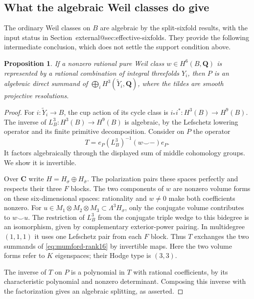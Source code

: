 \documentclass[11pt]{article}
\makeatletter
\providecommand{\compref}[1]{\csname external@#1\endcsname}
\newtheorem{proposition}[theorem]{Proposition}
\theoremstyle{definition}
\theoremstyle{remark}
\makeatother
\begin{document}
\subsection{What the algebraic Weil classes do give}

The ordinary Weil classes on $B$ are algebraic by the split-sixfold
results, with the input status in Section~\compref{sec:effective-sixfolds}.
They provide the following intermediate conclusion, which does not
settle the support condition above.

\begin{proposition}\label{prop:weil-support-middle}
If a nonzero rational pure Weil class $w\in H^6(B,\mathbf Q)$ is
represented by a rational combination of integral threefolds $Y_i$,
then $P$ is an algebraic direct summand of
$\bigoplus_i H^3(\widetilde Y_i,\mathbf Q)$, where the tildes are
smooth projective resolutions.
\end{proposition}

\begin{proof}
For $i:\widetilde Y_i\to B$, the cup action of its cycle class is
$i_*i^*:H^3(B)\to H^9(B)$.
The inverse of $L_B^3:H^3(B)\to H^9(B)$ is algebraic, by the
Lefschetz lowering operator and its finite primitive decomposition.
Consider on $P$ the operator
\[
 T=e_P(L_B^3)^{-1}(w\smile -)e_P.
\]
It factors algebraically through the displayed sum of middle
cohomology groups.  We show it is invertible.

Over $\mathbf C$ write $H=H_\sigma\oplus H_{\bar\sigma}$.
The polarization pairs these spaces perfectly and respects their
three $F$ blocks.  The two components of $w$ are nonzero volume
forms on these six-dimensional spaces: rationality and $w\ne0$
make both coefficients nonzero.  For
$u\in M_1\otimes M_2\otimes M_3\subset\Lambda^3H_\sigma$,
only the conjugate volume contributes to $w\smile u$.
The restriction of $L_B^3$ from the conjugate triple wedge to this
bidegree is an isomorphism, given by complementary exterior-power
pairing.  In multidegree $(1,1,1)$ it uses one Lefschetz pair from
each $F$ block.  Thus $T$ exchanges the two summands of
\eqref{eq:mumford-rank16} by invertible maps.  Here the two volume
forms refer to $K$ eigenspaces; their Hodge type is $(3,3)$.

The inverse of $T$ on $P$ is a polynomial in $T$ with rational
coefficients, by its characteristic polynomial and nonzero
determinant.  Composing this inverse with the factorization gives
an algebraic splitting, as asserted.
\end{proof}
\end{document}
